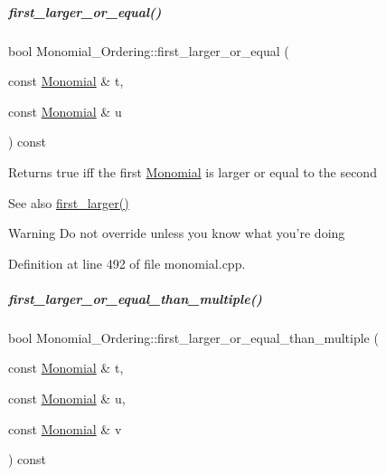 \mbox{\label{group__orderinggroup_afbae8e00a02ce0334bb0376cf0f0db75}} 
\subparagraph{\texorpdfstring{first\+\_\+larger\+\_\+or\+\_\+equal()}{first\_larger\_or\_equal()}}
{\footnotesize\ttfamily bool Monomial\+\_\+\+Ordering\+::first\+\_\+larger\+\_\+or\+\_\+equal (\begin{DoxyParamCaption}\item[{const \hyperlink{group__polygroup_class_monomial}{Monomial} \&}]{t,  }\item[{const \hyperlink{group__polygroup_class_monomial}{Monomial} \&}]{u }\end{DoxyParamCaption}) const}

\begin{DoxyReturn}{Returns}
{\ttfamily true} iff the first \hyperlink{group__polygroup_class_monomial}{Monomial} is larger or equal to the second 
\end{DoxyReturn}
\begin{DoxySeeAlso}{See also}
\hyperlink{group__orderinggroup_aed41fe82e1ca5cd287a93d287fee7c20}{first\+\_\+larger()} 
\end{DoxySeeAlso}
\begin{DoxyWarning}{Warning}
Do not override unless you know what you're doing 
\end{DoxyWarning}


Definition at line 492 of file monomial.\+cpp.

\mbox{\label{group__orderinggroup_ad4af4c79cf46666222fe30fdd4ceb45e}} 
\subparagraph{\texorpdfstring{first\+\_\+larger\+\_\+or\+\_\+equal\+\_\+than\+\_\+multiple()}{first\_larger\_or\_equal\_than\_multiple()}}
{\footnotesize\ttfamily bool Monomial\+\_\+\+Ordering\+::first\+\_\+larger\+\_\+or\+\_\+equal\+\_\+than\+\_\+multiple (\begin{DoxyParamCaption}\item[{const \hyperlink{group__polygroup_class_monomial}{Monomial} \&}]{t,  }\item[{const \hyperlink{group__polygroup_class_monomial}{Monomial} \&}]{u,  }\item[{const \hyperlink{group__polygroup_class_monomial}{Monomial} \&}]{v }\end{DoxyParamCaption}) const}

